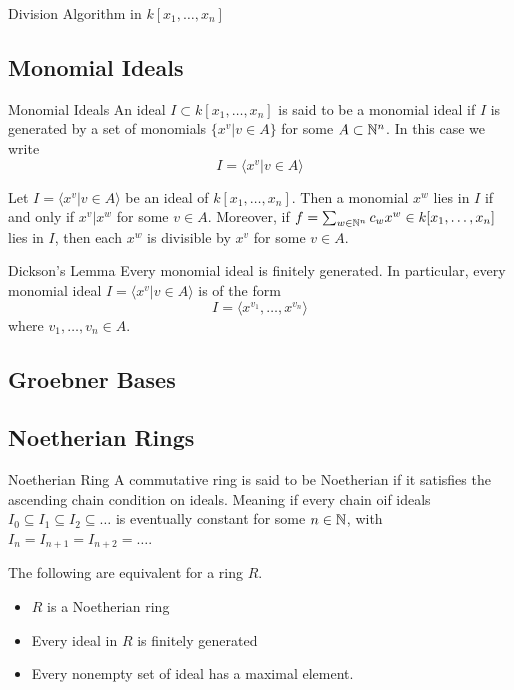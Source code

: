 \documentclass[a4paper]{article}
\begin{document}
\begin{prp}{Division Algorithm in $k[x_1,\dots,x_n]$}{}
\end{prp}

\subsection{Monomial Ideals}
\begin{defn}{Monomial Ideals}{} An ideal $I\subset k[x_1,\dots,x_n]$ is said to be a monomial ideal if $I$ is generated by a set of monomials $\{x^v|v\in A\}$ for some $A\subset\mathbb{N}^n$. In this case we write $$I=\langle x^v|v\in A\rangle$$
\end{defn}

\begin{lmm}{}{} Let $I=\langle x^v|v\in A\rangle$ be an ideal of $k[x_1,\dots,x_n]$. Then a monomial $x^w$ lies in $I$ if and only if $x^v|x^w$ for some $v\in A$. Moreover, if $f=\sum_{w\in\mathbb{N}^n}c_wx^w\in k[x_1,\dots,x_n]$ lies in $I$, then each $x^w$ is divisible by $x^v$ for some $v\in A$. 
\end{lmm}

\begin{thm}{Dickson's Lemma}{} Every monomial ideal is finitely generated. In particular, every monomial ideal $I=\langle x^v|v\in A\rangle$ is of the form $$I=\langle x^{v_1},\dots,x^{v_n}\rangle$$ where $v_1,\dots,v_n\in A$. 
\end{thm}

\subsection{Groebner Bases}

\subsection{Noetherian Rings}
\begin{defn}{Noetherian Ring}{} A commutative ring is said to be Noetherian if it satisfies the ascending chain condition on ideals. Meaning if every chain oif ideals $I_0\subseteq I_1\subseteq I_2\subseteq\dots$ is eventually constant for some $n\in\mathbb{N}$, with $I_n=I_{n+1}=I_{n+2}=\dots$. 
\end{defn}

\begin{prp}{}{} The following are equivalent for a ring $R$. 
\begin{itemize}
\item $R$ is a Noetherian ring
\item Every ideal in $R$ is finitely generated
\item Every nonempty set of ideal has a maximal element. 
\end{itemize}
\end{prp}
\end{document}
